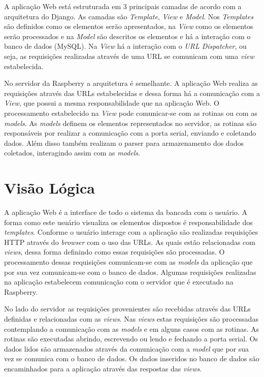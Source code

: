 A aplicação Web está estruturada em 3 principais camadas de acordo com a arquitetura do Django. As camadas são \textit{Template}, 
\textit{View} e \textit{Model}.
Nos \textit{Templates} são definidos como os elementos serão apresentados, na \textit{View} como os elementos serão processados e na
\textit{Model} são descritos os elementos e há a interação com o banco de dados (MySQL). Na \textit{View} há a interação com o 
\textit{URL Dispatcher}, ou seja, as requisições realizadas através de uma URL se comunicam com uma \textit{view} estabelecida.

No servidor da Raspberry a arquitetura é semelhante. A aplicação Web realiza as requisições através das URLs estabelecidas e dessa
forma há a comunicação com a \textit{View}, que possui a mesma responsabilidade que na aplicação Web. O processamento estabelecido
na \textit{View} pode comunicar-se com as rotinas ou com as \textit{models}. As \textit{models} definem os elementos representados no servidor,
as rotinas são responsáveis por realizar a comunicação com a porta serial, enviando e coletando dados. Além disso também realizam o
parser para armazenamento dos dados coletados, interagindo assim com as \textit{models}. 



\section*{Visão Lógica}
    A aplicação Web é a interface de todo o sistema da bancada com o usuário. A forma como este usuário 
    visualiza os elementos dispostos é responsabilidade dos \textit{templates}. Conforme o usuário interage com a
    aplicação são realizadas requisições HTTP através do \textit{browser} com o uso das URLs. As quais estão relacionadas com
    \textit{views}, dessa forma definindo como essas requisições são processadas. O processamento dessas requisições comunicam-se
    com as \textit{models} da aplicação que por sua vez comunicam-se com o banco de dados. Algumas requisições realizadas na aplicação
    estabelecem comunicação com o servidor que é executado na Raspberry.
    
    No lado do servidor as requisições provenientes são recebidas através das URLs definidas e relacionadas com as \textit{views}. Nas
    \textit{views} estas requisições são processadas contemplando a comunicação com as \textit{models} e em alguns casos com as rotinas. 
    As rotinas são executadas abrindo, escrevendo ou lendo e fechando a porta serial. Os dados lidos são armazenados através da comunicação
    com a \textit{model} que por sua vez se comunica com o banco de dados. Os dados inseridos no banco de dados são encaminhados para a
    aplicação através das respostas das \textit{views}. 
  
